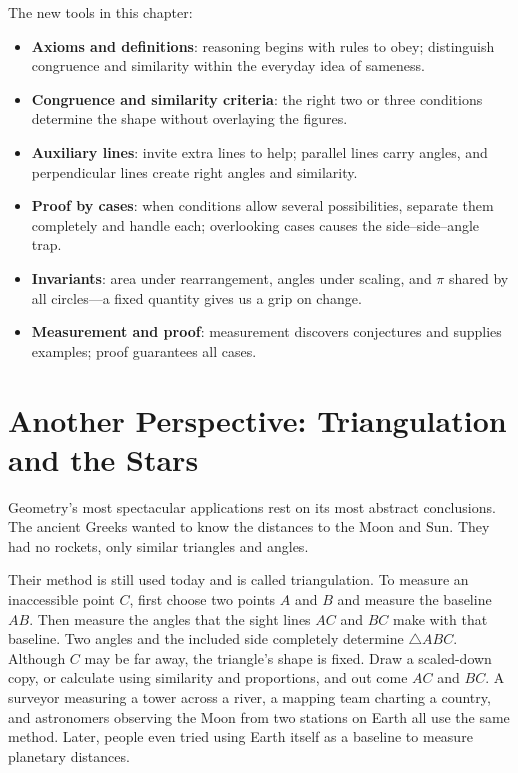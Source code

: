 \begin{toolbox}
The new tools in this chapter:
\begin{itemize}
\item \textbf{Axioms and definitions}: reasoning begins with rules to obey; distinguish congruence and similarity within the everyday idea of sameness.
\item \textbf{Congruence and similarity criteria}: the right two or three conditions determine the shape without overlaying the figures.
\item \textbf{Auxiliary lines}: invite extra lines to help; parallel lines carry angles, and perpendicular lines create right angles and similarity.
\item \textbf{Proof by cases}: when conditions allow several possibilities, separate them completely and handle each; overlooking cases causes the side--side--angle trap.
\item \textbf{Invariants}: area under rearrangement, angles under scaling, and $\pi$ shared by all circles---a fixed quantity gives us a grip on change.
\item \textbf{Measurement and proof}: measurement discovers conjectures and supplies examples; proof guarantees all cases.
\end{itemize}
\end{toolbox}

\section{Another Perspective: Triangulation and the Stars}

Geometry's most spectacular applications rest on its most abstract conclusions. The ancient Greeks wanted to know the distances to the Moon and Sun. They had no rockets, only similar triangles and angles.

Their method is still used today and is called triangulation. To measure an inaccessible point $C$, first choose two points $A$ and $B$ and measure the baseline $AB$. Then measure the angles that the sight lines $AC$ and $BC$ make with that baseline. Two angles and the included side completely determine $\triangle ABC$. Although $C$ may be far away, the triangle's shape is fixed. Draw a scaled-down copy, or calculate using similarity and proportions, and out come $AC$ and $BC$. A surveyor measuring a tower across a river, a mapping team charting a country, and astronomers observing the Moon from two stations on Earth all use the same method. Later, people even tried using Earth itself as a baseline to measure planetary distances.

